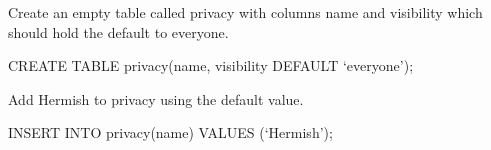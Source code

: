 \question

Create an empty table called privacy with columns  name and visibility which should hold the default to everyone.

\begin{solution}[0.5in]
CREATE TABLE privacy(name, visibility DEFAULT ‘everyone’);
\end{solution}

\question
Add Hermish to privacy using the default value. 

\begin{solution}[0.5in]
INSERT INTO privacy(name) VALUES (‘Hermish’);
\end{solution}




